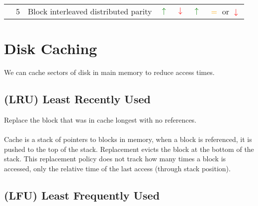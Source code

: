 \documentclass{report}
\begin{document}
\begin{center}
\begin{tabular}{c c c c c c c }
		                                    & 5                               & Block interleaved distributed parity  & \textcolor{green}{$\uparrow$}                               & \textcolor{red}{$\downarrow$}                               & \textcolor{green}{$\uparrow$} & \textcolor{orange}{$=$} or \textcolor{red}{$\downarrow$} \\
	\end{tabular}
\end{center}
\section*{Disk Caching}
We can cache sectors of disk in main memory to reduce access times.
\subsection*{(LRU) Least Recently Used}
Replace the block that was in cache longest with no references.
\\
\\ Cache is a stack of pointers to blocks in memory, when a block is
referenced, it is pushed to the top of the stack. Replacement evicts
the block at the bottom of the stack.
This replacement policy does not track how many times a block is accessed,
only the relative time of the last access (through stack position).
\subsection*{(LFU) Least Frequently Used}
\end{document}
